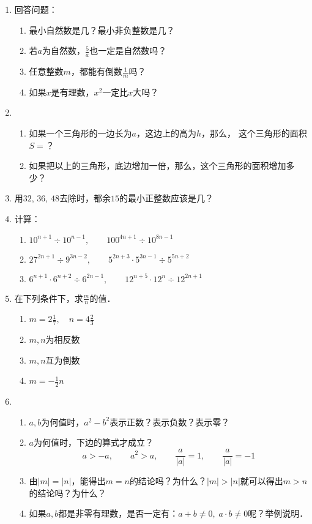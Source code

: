 \begin{enumerate}
	\item 回答问题：
	\begin{enumerate}
		\item 最小自然数是几？最小非负整数是几？
		\item 若$a$为自然数，$\frac{5}{a}$也一定是自然数吗？
		\item 任意整数$m$，都能有倒数$\frac{1}{m}$吗？
		\item 如果$x$是有理数，$x^2$一定比$x$大吗？
	\end{enumerate}
	
	\item \begin{enumerate}
		\item 如果一个三角形的一边长为$a$，这边上的高为$h$，那么，
		这个三角形的面积$S=$？
		\item 如果把以上的三角形，底边增加一倍，那么，这个三角形的面积增加多少？
	\end{enumerate}
	
	\item 用$32$, $36$, $48$去除时，都余$15$的最小正整数应该是几？
	
	\item 计算：
	\begin{enumerate}
		\item $10^{n+1}\div 10^{n-1}  ,\qquad 100^{4n+1}\div 10^{8n-1} $
		\item $27^{2n+1}\div 9^{3n-2}  ,\qquad 5^{2n+3}\cdot 5^{3n-1}\div 5^{5n+2} $
		\item $6^{n+1}\cdot 6^{n+2} \div 6^{2n-1},\qquad 12^{n+5}\cdot 12^n\div 12^{2n+1} $
	\end{enumerate}
	
	\item 在下列条件下，求$\frac{m}{n}$的值．
	\begin{multicols}{2}
		\begin{enumerate}
			\item $m=2\frac{1}{7},\quad n=4\frac{2}{3}$
			\item $m,n$为相反数
			\item $m,n$互为倒数
			\item $m=-\frac{1}{2}n$
		\end{enumerate}
	\end{multicols}
	
	\item  \begin{enumerate}
		\item $a,b$为何值时，$a^2-b^2$表示正数？表示负数？表示零？
		\item $a$为何值时，下边的算式才成立？
		\[a>-a,\qquad a^2>a,\qquad \frac{a}{|a|}=1,\qquad \frac{a}{|a|}=-1\]
		\item 由$|m|=|n|$，能得出$m=n$的结论吗？为什么？$|m|>|n|$就可以得出$m>n$的结论吗？为什么？
		\item 如果$a,b$都是非零有理数，是否一定有：$a+b\ne 0,\; a\cdot b\ne 0$呢？举例说明．
	\end{enumerate}
	

\end{enumerate}

